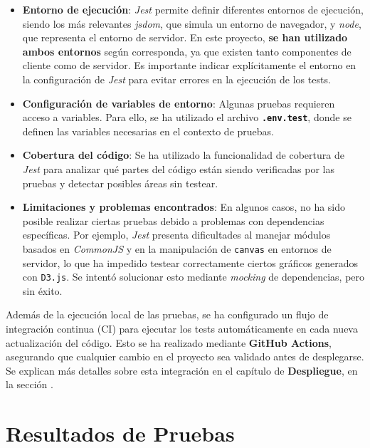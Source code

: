 \begin{itemize}
    \item \textbf{Entorno de ejecución}: \textit{Jest} permite definir diferentes entornos de ejecución, siendo los más relevantes \textit{jsdom}, que simula un entorno de navegador, y \textit{node}, que representa el entorno de servidor. En este proyecto, \textbf{se han utilizado ambos entornos} según corresponda, ya que existen tanto componentes de cliente como de servidor. Es importante indicar explícitamente el entorno en la configuración de \textit{Jest} para evitar errores en la ejecución de los tests.

    \item \textbf{Configuración de variables de entorno}: Algunas pruebas requieren acceso a variables. Para ello, se ha utilizado el archivo \textbf{\texttt{.env.test}}, donde se definen las variables necesarias en el contexto de pruebas.

    \item \textbf{Cobertura del código}: Se ha utilizado la funcionalidad de cobertura de \textit{Jest} para analizar qué partes del código están siendo verificadas por las pruebas y detectar posibles áreas sin testear.

    \item \textbf{Limitaciones y problemas encontrados}: En algunos casos, no ha sido posible realizar ciertas pruebas debido a problemas con dependencias específicas. Por ejemplo, \textit{Jest} presenta dificultades al manejar módulos basados en \textit{CommonJS} y en la manipulación de \texttt{canvas} en entornos de servidor, lo que ha impedido testear correctamente ciertos gráficos generados con \texttt{D3.js}. Se intentó solucionar esto mediante \textit{mocking} de dependencias, pero sin éxito.
\end{itemize}

Además de la ejecución local de las pruebas, se ha configurado un flujo de integración continua (CI) para ejecutar los tests automáticamente en cada nueva actualización del código. Esto se ha realizado mediante \textbf{GitHub Actions}, asegurando que cualquier cambio en el proyecto sea validado antes de desplegarse. Se explican más detalles sobre esta integración en el capítulo de \textbf{Despliegue}, en la sección .


\section{Resultados de Pruebas}
